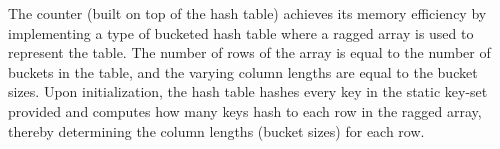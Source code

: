 The counter (built on top of the hash table) achieves its memory efficiency by implementing a type of bucketed hash table where a ragged array is used to represent the table. 
The number of rows of the array is equal to the number of buckets in the table, and the varying column lengths are equal to the bucket sizes.
Upon initialization, the hash table hashes every key in the static key-set provided and computes how many keys hash to each row in the ragged array, thereby determining the column lengths (bucket sizes) for each row.
